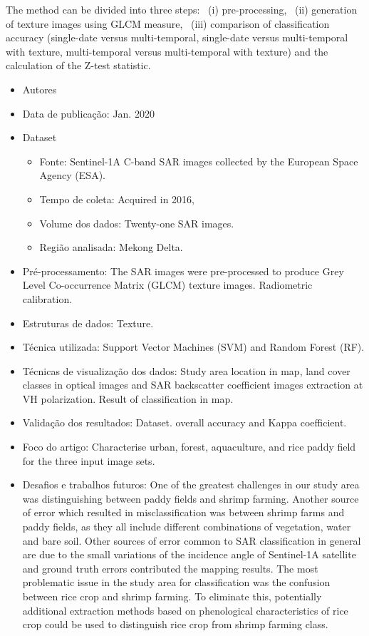 \documentclass[paper=a4, fontsize=11pt]{scrartcl}
\begin{document}
The method can be divided into three steps: 
~(i) pre-processing, 
~(ii) generation of texture images using GLCM measure, 
~(iii) comparison of classification accuracy (single-date versus multi-temporal, single-date versus multi-temporal with texture, multi-temporal versus multi-temporal with texture) and the calculation of the Z-test statistic. 

\begin{itemize}
	\item Autores~\cite{Ngo2020land}
	\item Data de publicação: Jan. 2020
	\item Dataset
	\begin{itemize}
		\item Fonte: Sentinel-1A C-band SAR images collected by the European Space Agency (ESA). 
		\item Tempo de coleta:  Acquired in 2016,
		\item Volume dos dados: Twenty-one SAR images.
		\item Região analisada: Mekong Delta.
	\end{itemize}
	\item Pré-processamento: The SAR images were pre-processed to produce Grey Level Co-occurrence Matrix (GLCM) texture images. Radiometric calibration.
	\item Estruturas de dados: Texture.
	\item Técnica utilizada: Support Vector Machines (SVM) and Random Forest (RF).
	\item Técnicas de visualização dos dados: Study area location in map, land cover classes in optical images and SAR backscatter coefficient images extraction at VH polarization. Result of classification in map.
	\item Validação dos resultados: Dataset. overall accuracy and Kappa coefficient. 
	\item Foco do artigo: Characterise urban, forest, aquaculture, and rice paddy field for the three input image sets. 
	\item Desafios e trabalhos futuros: One of the greatest challenges in our study area was distinguishing between paddy fields and shrimp farming. 
	Another source of error which resulted in misclassification was between shrimp farms and paddy fields, as they all include different combinations of vegetation, water and bare soil. 
	Other sources of error common to SAR classification in general are due to the small variations of the incidence angle of Sentinel-1A satellite and ground truth errors contributed the mapping results. 
	The most problematic issue in the study area for classification was the confusion between rice crop and shrimp farming. To eliminate this, potentially additional extraction methods based on phenological characteristics of rice crop could be used to distinguish rice crop from shrimp farming class.
\end{itemize}
\end{document}
